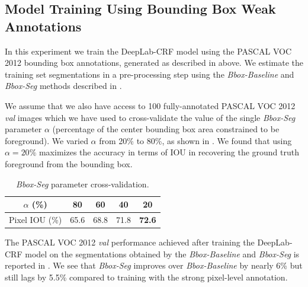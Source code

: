 \subsection{Model Training Using Bounding Box Weak Annotations}
\label{sec:test_bbox}

In this experiment we train the DeepLab-CRF model using the PASCAL VOC
2012 bounding box annotations, generated as described in
 above. We estimate the training set segmentations
in a pre-processing step using the \textsl{Bbox-Baseline} and
\textsl{Bbox-Seg} methods described in .

We assume that we also have access to 100 fully-annotated PASCAL VOC
2012 \textsl{val} images which we have used to cross-validate the
value of the single \textsl{Bbox-Seg} parameter $\alpha$ (percentage
of the center bounding box area constrained to be foreground). We
varied $\alpha$ from 20\% to 80\%, as shown in
. We found that using $\alpha = 20\%$
maximizes the accuracy in terms of IOU in recovering the ground truth
foreground from the bounding box.

\begin{table}
  \centering
  \caption{\textsl{Bbox-Seg} parameter cross-validation.}
  \begin{tabular}{c | c c c c}
    $\alpha$ (\%)    &  80   &  60   &  40   &  20   \\
    \hline
    Pixel IOU (\%) & 65.6  & 68.8  & 71.8  & {\bf 72.6}
    \end{tabular}
  \label{tb:bbox_erosion}
\end{table}

The PASCAL VOC 2012 \textsl{val} performance achieved after training
the DeepLab-CRF model on the segmentations obtained by the
\textsl{Bbox-Baseline} and \textsl{Bbox-Seg} is reported in
. We see that \textsl{Bbox-Seg} improves over
\textsl{Bbox-Baseline} by nearly 6\% but still lags by 5.5\% compared
to training with the strong pixel-level annotation.

\begin{table}
  \centering
  \caption{DeepLab-CRF VOC 2012 \textsl{val} IOU (\%) results
    using bounding box weak annotations \vs strong annotation in
    training.}
  \label{tb:bbox_annot}
\end{table}

